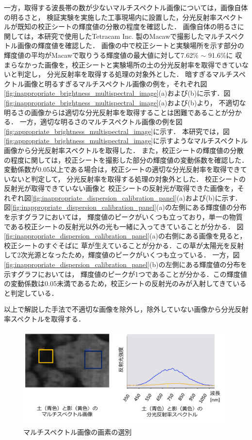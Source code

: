 一方，取得する波長帯の数が少ないマルチスペクトル画像については，画像自体の明るさと，
検証実験を実施した工事現場内に設置した，分光反射率スペクトルが既知の校正シートの輝度値の分散の程度を確認した．
画像自体の明るさに関しては，本研究で使用したTetracam Inc. 製のMacawで撮影したマルチスペクトル画像の輝度値を確認した．
画像の中で校正シートと実験場所を示す部分の輝度値の平均がMacawで取りうる輝度値の最大値に対して7.62\% $\sim$ 91.6\%に
収まらなかった画像を，校正シートと実験場所の土の分光反射率を取得できていないと判定し，
分光反射率を取得する処理の対象外とした．
暗すぎるマルチスペクトル画像と明るすぎるマルチスペクトル画像の例を，それぞれ図\ref{fig:inappropriate_brightness_multispectral_image}(a)および(b)に示す．図\ref{fig:inappropriate_brightness_multispectral_image}(a)および(b)より，
不適切な明るさの画像からは適切な分光反射率を取得することは困難であることが分かる．
一方，適切な明るさのマルチスペクトル画像の例を図\ref{fig:appropriate_brightness_multispectral_image}に示す．
本研究では，図\ref{fig:appropriate_brightness_multispectral_image}に示すようなマルチスペクトル画像から分光反射率スペクトルを取得した．
また，校正シートの輝度値の分散の程度に関しては，校正シートを撮影した部分の輝度値の変動係数を確認した．
変動係数が0.05以上である場合は，校正シートの適切な分光反射率を取得できていないと判定して，
分光反射率を取得する処理の対象外とした．
校正シートの反射光が取得できていない画像と
校正シートの反射光が取得できた画像を，それぞれ図\ref{fig:inappropriate_dispersion_calibration_panel}(a)および(b)に示す．
図\ref{fig:inappropriate_dispersion_calibration_panel}(a)の左側にある輝度値の分布を示すグラフにおいては，
輝度値のピークがいくつも立っており，単一の物質である校正シートの反射光以外の光も一緒に入ってきていることが分かる．
図\ref{fig:inappropriate_dispersion_calibration_panel}(a)の右側にある画像を見ると，校正シートのすぐそばに
草が生えていることが分かる．この草が太陽光を反射して2次光源となったため，輝度値のピークがいくつも立っている．
一方，図\ref{fig:inappropriate_dispersion_calibration_panel}(b)の左側にある輝度値の分布を示すグラフにおいては，
輝度値のピークが1つであることが分かる．この輝度値の変動係数は0.05未満であるため，校正シートの反射光のみが入射してきていると判定している．

以上で解説した手法で不適切な画像を除外し，除外していない画像から分光反射率スペクトルを取得する．

\begin{figure}[b]
      \begin{center}
            \includegraphics[width=11cm]{./Ch5_ConeIndexEstimation/Fig/hyperspectral_image_selection_compressed.pdf}
            \caption{マルチスペクトル画像の画素の選別}
            \label{fig:hyperspectral_image_selection}
      \end{center}
\end{figure}

